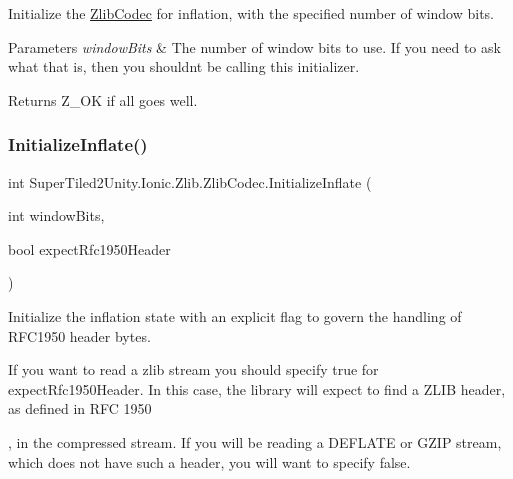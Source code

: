 Initialize the \mbox{\hyperlink{class_super_tiled2_unity_1_1_ionic_1_1_zlib_1_1_zlib_codec}{Zlib\+Codec}} for inflation, with the specified number of window bits. 


\begin{DoxyParams}{Parameters}
{\em window\+Bits} & The number of window bits to use. If you need to ask what that is, then you shouldn\textquotesingle{}t be calling this initializer.\\
\hline
\end{DoxyParams}
\begin{DoxyReturn}{Returns}
Z\+\_\+\+OK if all goes well.
\end{DoxyReturn}
\mbox{\label{class_super_tiled2_unity_1_1_ionic_1_1_zlib_1_1_zlib_codec_a3104516f5fd8ab82eac15ee761d7bb91}} 
\subsubsection{\texorpdfstring{Initialize\+Inflate()}{InitializeInflate()}\hspace{0.1cm}{\footnotesize\ttfamily [4/4]}}
{\footnotesize\ttfamily int Super\+Tiled2\+Unity.\+Ionic.\+Zlib.\+Zlib\+Codec.\+Initialize\+Inflate (\begin{DoxyParamCaption}\item[{int}]{window\+Bits,  }\item[{bool}]{expect\+Rfc1950\+Header }\end{DoxyParamCaption})}



Initialize the inflation state with an explicit flag to govern the handling of R\+F\+C1950 header bytes. 

If you want to read a zlib stream you should specify true for expect\+Rfc1950\+Header. In this case, the library will expect to find a Z\+L\+IB header, as defined in R\+FC 1950

, in the compressed stream. If you will be reading a D\+E\+F\+L\+A\+TE or G\+Z\+IP stream, which does not have such a header, you will want to specify false. 


